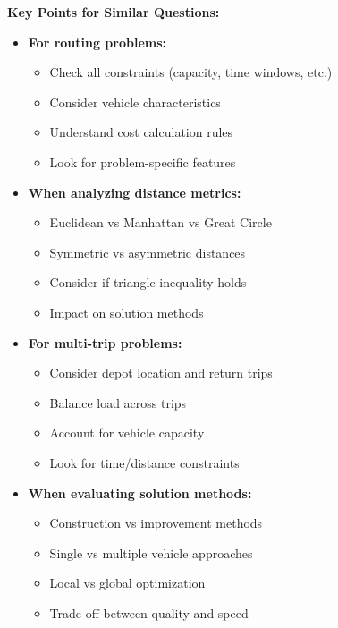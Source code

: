 \textbf{Key Points for Similar Questions:}
\begin{itemize}
\item \textbf{For routing problems:}
  \begin{itemize}
  \item Check all constraints (capacity, time windows, etc.)
  \item Consider vehicle characteristics
  \item Understand cost calculation rules
  \item Look for problem-specific features
  \end{itemize}

\item \textbf{When analyzing distance metrics:}
  \begin{itemize}
  \item Euclidean vs Manhattan vs Great Circle
  \item Symmetric vs asymmetric distances
  \item Consider if triangle inequality holds
  \item Impact on solution methods
  \end{itemize}

\item \textbf{For multi-trip problems:}
  \begin{itemize}
  \item Consider depot location and return trips
  \item Balance load across trips
  \item Account for vehicle capacity
  \item Look for time/distance constraints
  \end{itemize}

\item \textbf{When evaluating solution methods:}
  \begin{itemize}
  \item Construction vs improvement methods
  \item Single vs multiple vehicle approaches
  \item Local vs global optimization
  \item Trade-off between quality and speed
  \end{itemize}
\end{itemize}

